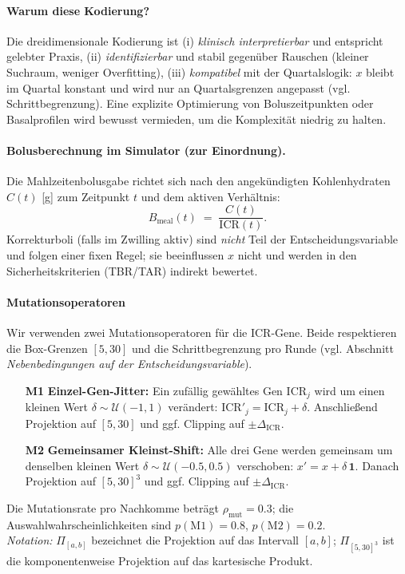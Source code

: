 \documentclass[ngerman,a4paper,12pt,pdftex]{article}
\newcommand{\ICR}{\mathrm{ICR}}
\newcommand{\DICR}{\Delta_{\mathrm{ICR}}}
\begin{document}
\paragraph{Warum diese Kodierung?}
Die dreidimensionale Kodierung ist (i) \emph{klinisch interpretierbar} und entspricht gelebter Praxis, (ii) \emph{identifizierbar} und stabil gegen\"uber Rauschen (kleiner Suchraum, weniger Overfitting), (iii) \emph{kompatibel} mit der Quartalslogik: \(x\) bleibt im Quartal konstant und wird nur an Quartalsgrenzen angepasst (vgl. Schrittbegrenzung). Eine explizite Optimierung von Boluszeitpunkten oder Basalprofilen wird bewusst vermieden, um die Komplexit\"at niedrig zu halten.

\paragraph{Bolusberechnung im Simulator (zur Einordnung).}
Die Mahlzeitenbolusgabe richtet sich nach den angek\"undigten Kohlenhydraten \(C(t)\) [g] zum Zeitpunkt \(t\) und dem aktiven Verh\"altnis: \[B_{\mathrm{meal}}(t)\;=\;\frac{C(t)}{\ICR(t)}.\] Korrekturboli (falls im Zwilling aktiv) sind \emph{nicht} Teil der Entscheidungsvariable und folgen einer fixen Regel; sie beeinflussen \(x\) nicht und werden in den Sicherheitskriterien (TBR/TAR) indirekt bewertet.


\paragraph{Mutationsoperatoren}
Wir verwenden zwei Mutationsoperatoren für die ICR-Gene. Beide respektieren die Box-Grenzen \([5,30]\) und die Schrittbegrenzung pro Runde (vgl. Abschnitt \emph{Nebenbedingungen auf der Entscheidungsvariable}).
\begin{itemize}
  \item[\textbf{M1}] \textbf{Einzel-Gen-Jitter:} Ein zufällig gewähltes Gen \(\ICR_j\) wird um einen kleinen Wert \(\delta\sim\mathcal{U}(-1,1)\) verändert: \(\ICR'_j=\ICR_j+\delta\). Anschließend Projektion auf \([5,30]\) und ggf. Clipping auf \(\pm\DICR\).
  \item[\textbf{M2}] \textbf{Gemeinsamer Kleinst-Shift:} Alle drei Gene werden gemeinsam um denselben kleinen Wert \(\delta\sim\mathcal{U}(-0.5,0.5)\) verschoben: \(x' = x + \delta\,\mathbf{1}\). Danach Projektion auf \([5,30]^3\) und ggf. Clipping auf \(\pm\DICR\).
\end{itemize}
Die Mutationsrate pro Nachkomme beträgt \(\rho_{\mathrm{mut}}=0.3\); die Auswahlwahrscheinlichkeiten sind \(p(\text{M1})=0.8\), \(p(\text{M2})=0.2\).\\
\emph{Notation:} \(\Pi_{[a,b]}\) bezeichnet die Projektion auf das Intervall \([a,b]\); \(\Pi_{[5,30]^3}\) ist die komponentenweise Projektion auf das kartesische Produkt.
\end{document}
